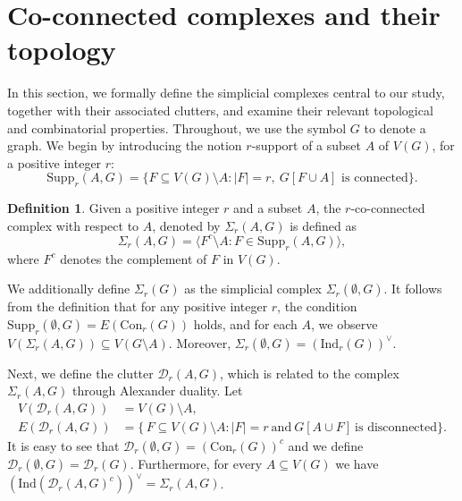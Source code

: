 \documentclass[12pt,reqno]{amsart}
\theoremstyle{definition}
\newtheorem{definition}[proposition]{Definition}
\newcommand{\Con}{{\mathrm{Con}}}
\newcommand{\Supp}{\mathrm{Supp}}
\def\D{\mathcal{D}}
\begin{document}
    
\section{Co-connected complexes and their topology}\label{sec-3}
	
In this section, we formally define the simplicial complexes central to our study, together with their associated clutters, and examine their relevant topological and combinatorial properties. Throughout, we use the symbol $G$ to denote a graph. We begin by introducing the notion $r$-support of a subset $A$ of $V(G)$, for a positive integer $r$:
	\[
	\mathrm{Supp}_r(A, G) = \{ F \subseteq V(G)\setminus A : |F| = r,\  \text{$G[F \cup A]$ is connected} \}.
	\]
\begin{definition}
Given a positive integer $r$ and a subset $A$, the $r$-co-connected complex with respect to $A$, denoted by $\Sigma_r(A,G)$ is defined as
\[
	\Sigma_r(A,G) = \langle F^{c} \setminus A : F \in \mathrm{Supp}_r(A,G) \rangle ,
\]
where $F^{c}$ denotes the complement of $F$ in $V(G)$.    
\end{definition}


We additionally define $\Sigma_r(G)$ as the simplicial complex $\Sigma_r(\emptyset, G)$. 
It follows from the definition that for any positive integer $r$, the condition $\Supp_r(\emptyset,G) = E(\Con_r(G))$ holds, and for each $A$, we observe $V(\Sigma_r(A,G)) \subseteq V(G \setminus A)$. 
Moreover, $\Sigma_r(\emptyset, G)=(\mathrm{Ind}_r(G))^{\vee}$.

Next, we define the clutter $\D_r(A,G)$, which is related to the complex $\Sigma_r(A,G)$ through Alexander duality. Let
\begin{align*}
V(\D_r(A,G))&=V(G)\setminus A,\\
   E(\D_r(A,G)) &= \{\,F \subseteq V(G)\setminus A : |F|=r \ \text{and}\ G[A \cup F]\ \text{is disconnected}\}.
\end{align*}
It is easy to see that $\D_r(\emptyset,G)=(\Con_r(G))^c$ and we define $\D_r(\emptyset,G) = \D_r(G)$. Furthermore, for every $A \subseteq V(G)$ we have $(\mathrm{Ind}(\D_r(A,G)^c))^{\vee}=\Sigma_r(A,G)$. 
\end{document}
